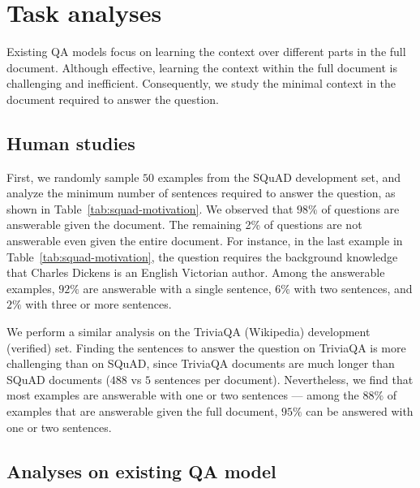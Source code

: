 \documentclass[11pt,a4paper]{article}
\begin{document}
 \section{Task analyses}\label{sec:motivation}Existing QA models focus on learning the context over different parts in the full document.
Although effective, learning the context within the full document is challenging and inefficient.
Consequently, we study the minimal context in the document required to answer the question.

\subsection{Human studies}

First, we randomly sample $50$ examples from the SQuAD development set, and analyze the minimum number of sentences required to answer the question, as shown in Table~\ref{tab:squad-motivation}.
We observed that $98\%$ of questions are answerable given the document. The remaining 2\% of questions are not answerable even given the entire document.
For instance, in the last example in Table~\ref{tab:squad-motivation}, the question requires the background knowledge that Charles Dickens is an English Victorian author.
Among the answerable examples, $92\%$ are answerable with a single sentence, $6\%$ with two sentences, and $2\%$ with three or more sentences.


We perform a similar analysis on the TriviaQA (Wikipedia) development (verified) set.
Finding the sentences to answer the question on TriviaQA is more challenging than on SQuAD, since TriviaQA documents are much longer than SQuAD documents ($488$ vs $5$ sentences per document).
Nevertheless, we find that most examples are answerable with one or two sentences --- among the $88\%$ of examples that are answerable given the full document, $95\%$ can be answered with one or two sentences.

\subsection{Analyses on existing QA model}
\end{document}
